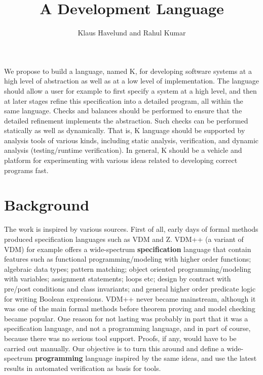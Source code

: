 \documentclass{llncs}
\title{A Development Language}
\author{Klaus Havelund and Rahul Kumar}
\institute{
  Jet Propulsion Laboratory\\
  California Institute of Technology\\
  California, USA
}
\newcommand{\lang}{K}
\begin{document}
\maketitle 

We propose to build a language, named \lang{}, for developing
software systems at a high level of abstraction as well as at a low
level of implementation. The language should allow a user for example
to first specify a system at a high level, and then at later stages
refine this specification into a detailed program, all within the same
language.  Checks and balances should be performed to ensure that the
detailed refinement implements the abstraction. Such checks can be
performed statically as well as dynamically. That is, \lang{} language
should be supported by analysis tools of various kinds, including
static analysis, verification, and dynamic analysis (testing/runtime
verification). In general, \lang{} should be a vehicle and platform
for experimenting with various ideas related to developing correct
programs fast.


\section{Background}
The work is inspired by various sources. First of all, early days of
formal methods produced specification languages such as VDM and
Z. VDM++ (a variant of VDM) for example offers a wide-spectrum {\bf
  specification} language that contain features such as functional
programming/modeling with higher order functions; algebraic data
types; pattern matching; object oriented programming/modeling with
variables; assignment statements; loops etc; design by contract with
pre/post conditions and class invariants; and general higher order
predicate logic for writing Boolean expressions. VDM++ never became
mainstream, although it was one of the main formal methods before
theorem proving and model checking became popular.  One reason for not
lasting was probably in part that it was a specification language, and
not a programming language, and in part of course, because there was
no serious tool support. Proofs, if any, would have to be carried out
manually.  Our objective is to turn this around and define a
wide-spectrum {\bf programming} language inspired by the same ideas,
and use the latest results in automated verification as basis for
tools.
\end{document}
